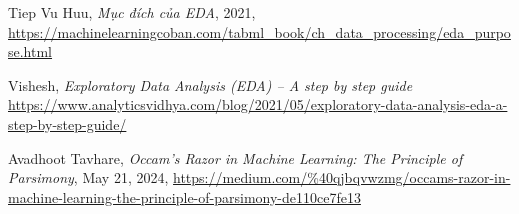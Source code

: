 \begin{thebibliography}{9}

	Tiep Vu Huu,
	\textit{Mục đích của EDA}, 2021,
	\newline
	\url{https://machinelearningcoban.com/tabml_book/ch_data_processing/eda_purpose.html}

	Vishesh,
	\textit{Exploratory Data Analysis (EDA) – A step by step guide}
	\newline
	\url{https://www.analyticsvidhya.com/blog/2021/05/exploratory-data-analysis-eda-a-step-by-step-guide/}

	Avadhoot Tavhare,
	\textit{Occam’s Razor in Machine Learning: The Principle of Parsimony}, May 21, 2024,
	\newline
	\url{https://medium.com/%40qjbqvwzmg/occams-razor-in-machine-learning-the-principle-of-parsimony-de110ce7fe13}

\end{thebibliography}
